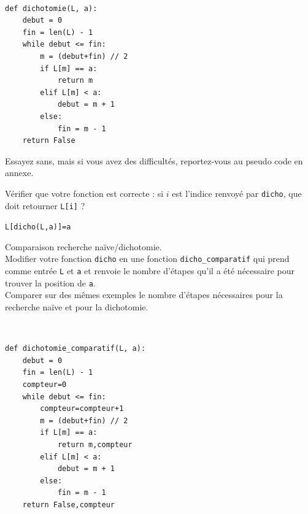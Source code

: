 \begin{solution}~\\
\vspace{-0.7cm}
\begin{verbatim}
def dichotomie(L, a):
    debut = 0
    fin = len(L) - 1
    while debut <= fin:
        m = (debut+fin) // 2
        if L[m] == a:
            return m
        elif L[m] < a:
            debut = m + 1
        else:
            fin = m - 1
    return False
\end{verbatim}
\end{solution}

\begin{remark}
Essayez sans, mais si vous avez des difficultés, reportez-vous au pseudo code en annexe.
\end{remark}


\begin{exercice}
Vérifier que votre fonction est correcte : si $i$ est l'indice renvoyé par \verb?dicho?, que doit retourner \verb?L[i]? ?
\end{exercice}

\begin{solution}
\verb?L[dicho(L,a)]=a?
\end{solution}



\begin{exercice}Comparaison recherche naïve/dichotomie.\\
Modifier votre fonction \verb?dicho? en une fonction \verb?dicho_comparatif? qui prend comme entrée \verb?L? et \verb?a? et renvoie le nombre d'étapes qu'il a été nécessaire pour trouver la position de \verb?a?. \\
Comparer sur des mêmes exemples le nombre d'étapes nécessaires pour la recherche naïve et pour la dichotomie.
\end{exercice}

\begin{solution}~\\
\vspace{-0.7cm}
\begin{verbatim}
def dichotomie_comparatif(L, a):
    debut = 0
    fin = len(L) - 1
    compteur=0
    while debut <= fin:
        compteur=compteur+1
        m = (debut+fin) // 2
        if L[m] == a:
            return m,compteur
        elif L[m] < a:
            debut = m + 1
        else:
            fin = m - 1
    return False,compteur
\end{verbatim}
\end{solution}



